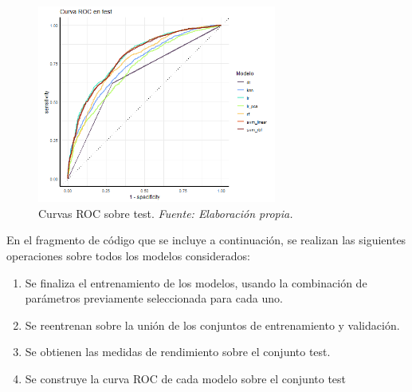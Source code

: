 \documentclass[12pt,a4paper,]{book}
\providecommand{\tightlist}{%
  \setlength{\itemsep}{0pt}\setlength{\parskip}{0pt}}
\numberwithin{dummy}{section}
\theoremstyle{ocrenumbox}
\theoremstyle{blacknumex}
\theoremstyle{blacknumbox}
\theoremstyle{ocrenum}
\theoremstyle{ocrenum}
\begin{document}
\begin{figure}[H]
\centering
\includegraphics[width =0.7\textwidth]{graficos/roc_test.png}
\caption[Curvas ROC sobre test]{Curvas ROC sobre test. \it Fuente: Elaboración propia.}
\label{fig:roc_test}
\end{figure}

En el fragmento de código que se incluye a continuación, se realizan las
siguientes operaciones sobre todos los modelos considerados:

\begin{enumerate}
\def\labelenumi{\arabic{enumi}.}
\tightlist
\item
  Se finaliza el entrenamiento de los modelos, usando la combinación de
  parámetros previamente seleccionada para cada uno.
\item
  Se reentrenan sobre la unión de los conjuntos de entrenamiento y
  validación.
\item
  Se obtienen las medidas de rendimiento sobre el conjunto test.
\item
  Se construye la curva ROC de cada modelo sobre el conjunto test
\end{enumerate}
\end{document}
